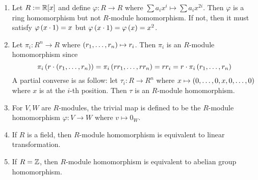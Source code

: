 \begin{ex}
    \hfill
    
    \begin{enumerate}
        \item Let $R:= {\mathbb R}[x]$ and define $\varphi:R\to R$ where $\sum a_ix^i\mapsto \sum a_ix^{2i}$. Then $\varphi$ is a ring homomorphism but not $R$-module homomorphism. If not, then it must satisfy $\varphi\left(x\cdot 1\right)=x$ but $\varphi\left(x\cdot 1\right)=\varphi\left(x\right)=x^2$.
        \item Let $\pi_i:R^n \to R$ where $\left(r_1,\dots,r_n\right)\mapsto r_i$. Then $\pi_i$ is an $R$-module homomorphism since
        \[\pi_i\left(r\cdot\left(r_1,\dots, r_n\right)\right)=\pi_i\left(rr_1, \dots, rr_n\right) = rr_i = r\cdot \pi_i\left(r_1, \dots, r_n\right)\]
        A partial converse is as follow: let $\tau_i:R\to R^n$ where $x\mapsto \left(0,\dots, 0,x, 0,\dots, 0\right)$ where $x$ is at the $i$-th position. Then $\tau$ is an $R$-module homomorphism.
        \item For $V,W$ are $R$-modules, the trivial map is defined to be the $R$-module homomorphism $\varphi:V\to W$ where $v\mapsto 0_W$.
        \item If $R$ is a field, then $R$-module homomorphism is equivalent to linear transformation.
        \item If $R={\mathbb Z}$, then $R$-module homomorphism is equivalent to abelian group homomorphism.
    \end{enumerate}
\end{ex}

\medskip

